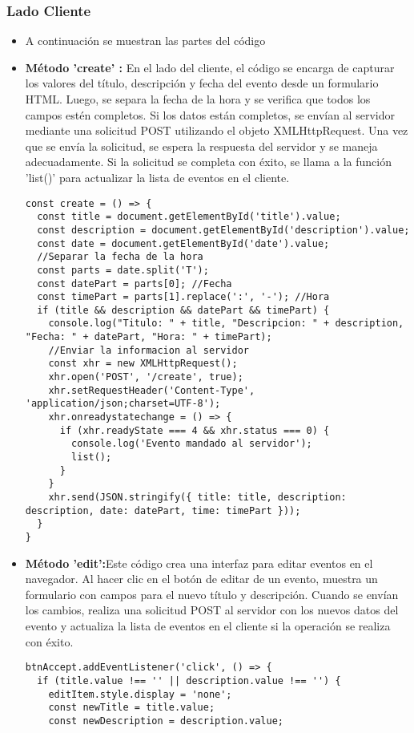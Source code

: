 \documentclass{article}
\begin{document}
\subsubsection{Lado Cliente}
\begin{itemize}
\item{ A continuación se muestran las partes del código}

\item{\textbf{Método 'create' :} En el lado del cliente, el código se encarga de capturar los valores del título, descripción y fecha del evento desde un formulario HTML. Luego, se separa la fecha de la hora y se verifica que todos los campos estén completos. Si los datos están completos, se envían al servidor mediante una solicitud POST utilizando el objeto XMLHttpRequest. Una vez que se envía la solicitud, se espera la respuesta del servidor y se maneja adecuadamente. Si la solicitud se completa con éxito, se llama a la función 'list()' para actualizar la lista de eventos en el cliente.} 
\begin{lstlisting}[style=ascii-tree]
const create = () => {
  const title = document.getElementById('title').value;
  const description = document.getElementById('description').value;
  const date = document.getElementById('date').value;
  //Separar la fecha de la hora
  const parts = date.split('T');
  const datePart = parts[0]; //Fecha
  const timePart = parts[1].replace(':', '-'); //Hora
  if (title && description && datePart && timePart) {
    console.log("Titulo: " + title, "Descripcion: " + description, "Fecha: " + datePart, "Hora: " + timePart);
    //Enviar la informacion al servidor
    const xhr = new XMLHttpRequest();
    xhr.open('POST', '/create', true);
    xhr.setRequestHeader('Content-Type', 'application/json;charset=UTF-8');
    xhr.onreadystatechange = () => {
      if (xhr.readyState === 4 && xhr.status === 0) {
        console.log('Evento mandado al servidor');
        list();
      }
    }
    xhr.send(JSON.stringify({ title: title, description: description, date: datePart, time: timePart }));
  }
}
\end{lstlisting}

\item{\textbf{Método 'edit':}Este código crea una interfaz para editar eventos en el navegador. Al hacer clic en el botón de editar de un evento, muestra un formulario con campos para el nuevo título y descripción. Cuando se envían los cambios, realiza una solicitud POST al servidor con los nuevos datos del evento y actualiza la lista de eventos en el cliente si la operación se realiza con éxito.} 
\begin{lstlisting}[style=ascii-tree]
btnAccept.addEventListener('click', () => {
  if (title.value !== '' || description.value !== '') {
    editItem.style.display = 'none';
    const newTitle = title.value;
    const newDescription = description.value;


\end{lstlisting}
\end{itemize}
\end{document}
